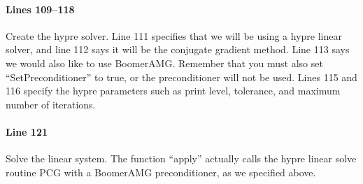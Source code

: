 \paragraph{Lines 109--118}
Create the hypre solver.  Line 111 specifies that we will be using a hypre
linear solver, and line 112 says it will be the conjugate gradient method.  Line
113 says we would also like to use BoomerAMG.  Remember that you must also set
``SetPreconditioner'' to true, or the preconditioner will not be used.  Lines
115 and 116 specify the hypre parameters such as print level, tolerance, and
maximum number of iterations.

\paragraph{Line 121}
Solve the linear system.  The function ``apply'' actually calls the hypre linear
solve routine PCG with a BoomerAMG preconditioner, as we specified above.